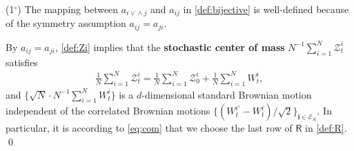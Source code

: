 \documentclass[10pt,a4paper]{amsart}
\newcommand{\bi}{\mathbf i}
\newcommand{\cc}{{^\circ}}
\newcommand{\mc}{\mathcal}
\newcommand{\two}{{\sqrt{2}}}
\begin{document}
\begin{rmk}\label{rmk:com}
{\rm (1$\cc$)} The mapping between $a_{i\vee\!\wedge j}$ and $a_{ij}$ in \eqref{def:bijective} is well-defined because of the symmetry assumption $a_{ij}=a_{ji}$.\medskip 

\noindent {\rm (2$\cc$)} By $a_{ij}=a_{ji}$, \eqref{def:Zi} implies that the {\bf stochastic center of mass} $N^{-1}\sum_{i=1}^N \mc Z^i_t$ satisfies
\begin{align}\label{eq:com}
\frac{1}{N}\sum_{i=1}^N \mc Z^i_t=\frac{1}{N}\sum_{i=1}^N \mc Z^i_0+\frac{1}{N}\sum_{i=1}^NW^i_t,
\end{align}
and $\{\sqrt{N}\cdot N^{-1}\sum_{i=1}^NW^i_t \}$ is a $d$-dimensional standard Brownian motion independent of the correlated Brownian motions $\{(W^{i\prime}_t-W^i_t)/\two \}_{\bi\in \mc E_N}$. In particular, it is according to \eqref{eq:com} that we choose the last row of $\mathsf  R$ in \eqref{def:R}. 
\qed 
\end{rmk}
\end{document}
